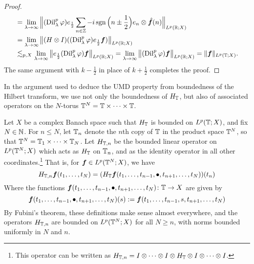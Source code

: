 \begin{proof}
\begin{equation*}
\begin{aligned}
         &= \lim_{\lambda \to \infty} \Big\| (\operatorname{Dil}_{\lambda}^{p}\varphi) e_{\frac{1}{2}} \sum_{n \in \mathbb{Z}} -i \operatorname{sgn}\Big(n\pm\frac{1}{2}\Big) e_{n} \otimes \hat{\bm{f}}(n) \Big\|_{L^p(\mathbb{R};X)} \\
         &= \lim_{\lambda \to \infty} \big\| (H \otimes I)((\operatorname{Dil}_{\lambda}^{p} \varphi)e_{\frac{1}{2}} \bm{f}) \big\|_{L^p(\mathbb{R};X)} \\
         &\lesssim_{p,X} \lim_{\lambda \to \infty} \big\| e_{\frac{1}{2}} (\operatorname{Dil}_{\lambda}^{p} \varphi)  \bm{f} \big\|_{L^p(\mathbb{R};X)} 
         = \lim_{\lambda \to \infty} \big\| (\operatorname{Dil}_{\lambda}^{p} \varphi)  \bm{f} \big\|_{L^p(\mathbb{R};X)} 
         = \| \bm{f} \|_{L^p(\mathbb{T};X)}.
       \end{aligned}
     \end{equation*}
     The same argument with $k - \frac{1}{2}$ in place of $k + \frac{1}{2}$ completes the proof.
  \end{proof}

  In the argument used to deduce the UMD property from boundedness of the Hilbert transform, we use not only the boundedness of $H_{\mathbb{T}}$, but also of associated operators on the $N$-torus $\mathbb{T}^{N} = \mathbb{T} \times \cdots \times \mathbb{T}$.

  \begin{defn}\label{defn:higher-HT}
    Let $X$ be a complex Banach space such that $H_{\mathbb{T}}$ is bounded on $L^p(\mathbb{T};X)$, and fix $N \in \mathbb{N}$.
    For $n \leq N$, let $\mathbb{T}_{n}$ denote the $n$th copy of $\mathbb{T}$ in the product space $\mathbb{T}^{N}$, so that $\mathbb{T}^{N} = \mathbb{T}_{1} \times \cdots \times \mathbb{T}_{N}$.
    Let $H_{\mathbb{T},n}$ be the bounded linear operator on $L^p(\mathbb{T}^{N};X)$ which acts as $H_{\mathbb{T}}$ on $\mathbb{T}_{n}$, and as the identity operator in all other coordinates.\footnote{This operator can be written as $H_{\mathbb{T},n} = I \otimes \cdots \otimes I \otimes H_{\mathbb{T}} \otimes I \otimes \cdots \otimes I$.}
    That is, for $\bm{f} \in L^p(\mathbb{T}^{N};X)$, we have
    \begin{equation*}
      H_{\mathbb{T},n}\bm{f}(t_{1}, \ldots, t_{N}) = (H_{\mathbb{T}} \bm{f}(t_{1}, \ldots, t_{n-1}, \bullet, t_{n+1}, \ldots, t_{N}))(t_{n})
    \end{equation*}
    Where the functions $\bm{f}(t_{1}, \ldots, t_{n-1}, \bullet, t_{n+1}, \ldots, t_{N}) \colon \mathbb{T} \to X$ are given by
    \begin{equation*}
      \bm{f}(t_{1}, \ldots, t_{n-1}, \bullet, t_{n+1}, \ldots, t_{N})(s) := \bm{f}(t_{1}, \ldots, t_{n-1}, s, t_{n+1}, \ldots, t_{N})
    \end{equation*}
    By Fubini's theorem, these definitions make sense almost everywhere, and the operators $H_{\mathbb{T},n}$ are bounded on $L^p(\mathbb{T}^{N};X)$ for all $N \geq n$, with norms bounded uniformly in $N$ and $n$.
  \end{defn}


